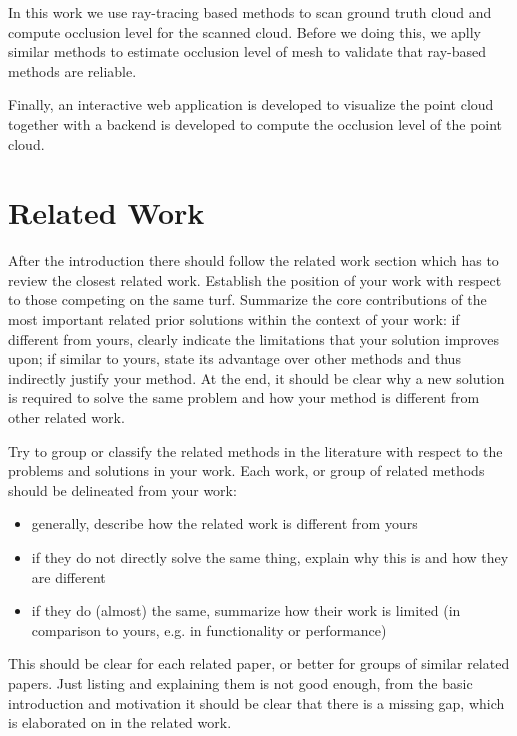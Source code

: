 \documentclass[11pt, a4paper,oneside,chapterprefix=false]{scrbook}
\begin{document}
In this work we use ray-tracing based methods to scan ground truth cloud and compute occlusion level for the scanned cloud. Before we doing this, we aplly similar methods to estimate occlusion level of mesh to validate that ray-based methods are reliable.

Finally, an interactive web application is developed to visualize the point cloud together with a backend is developed to compute the occlusion level of the point cloud.

\chapter{Related Work} \label{chp:related}

After the introduction there should follow the related work section which has to review the closest related work. Establish the position of your work with respect to those competing on the same turf. Summarize the core contributions of the most important related prior solutions within the context of your work: if different from yours, clearly indicate the limitations that your solution improves upon; if similar to yours, state its advantage over other methods and thus indirectly justify your method. At the end, it should be clear why a new solution is required to solve the same problem and how your method is different from other related work.

Try to group or classify the related methods in the literature with respect to the problems and solutions in your work. Each work, or group of related methods should be delineated from your work:

\begin{itemize}
\item generally, describe how the related work is different from yours
\item if they do not directly solve the same thing, explain why this is and how they are different
\item if they do (almost) the same, summarize how their work is limited (in comparison to yours, e.g. in functionality or performance)
\end{itemize}

This should be clear for each related paper, or better for groups of similar related papers. Just listing and explaining them is not good enough, from the basic introduction and motivation it should be clear that there is a missing gap, which is elaborated on in the related work.
\end{document}
